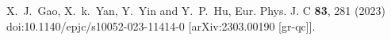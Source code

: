 \documentclass[a4paper,11pt]{article}
\begin{document}
\begin{thebibliography}{100}
X.~J.~Gao, X.~k.~Yan, Y.~Yin and Y.~P.~Hu,
Eur. Phys. J. C \textbf{83}, 281 (2023)
doi:10.1140/epjc/s10052-023-11414-0
[arXiv:2303.00190 [gr-qc]].



\end{thebibliography}
\end{document}
